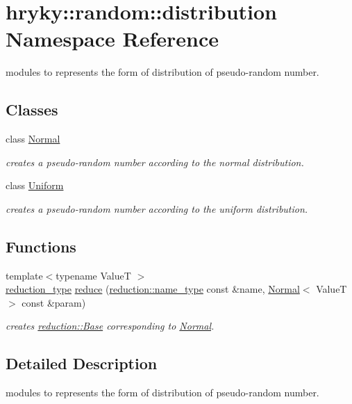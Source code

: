 \hypertarget{namespacehryky_1_1random_1_1distribution}{\section{hryky\-:\-:random\-:\-:distribution Namespace Reference}
\label{namespacehryky_1_1random_1_1distribution}
}


modules to represents the form of distribution of pseudo-\/random number.  


\subsection*{Classes}
\begin{DoxyCompactItemize}
\item 
class \hyperlink{classhryky_1_1random_1_1distribution_1_1_normal}{Normal}
\begin{DoxyCompactList}\small\item\em creates a pseudo-\/random number according to the normal distribution. \end{DoxyCompactList}\item 
class \hyperlink{classhryky_1_1random_1_1distribution_1_1_uniform}{Uniform}
\begin{DoxyCompactList}\small\item\em creates a pseudo-\/random number according to the uniform distribution. \end{DoxyCompactList}\end{DoxyCompactItemize}
\subsection*{Functions}
\begin{DoxyCompactItemize}
\item 
\hypertarget{namespacehryky_1_1random_1_1distribution_a036b49db88fa8504b2a893ce60f9ad03}{{\footnotesize template$<$typename Value\-T $>$ }\\\hyperlink{namespacehryky_a343a9a4c36a586be5c2693156200eadc}{reduction\-\_\-type} \hyperlink{namespacehryky_1_1random_1_1distribution_a036b49db88fa8504b2a893ce60f9ad03}{reduce} (\hyperlink{namespacehryky_1_1reduction_ac686c30a4c8d196bbd0f05629a6b921f}{reduction\-::name\-\_\-type} const \&name, \hyperlink{classhryky_1_1random_1_1distribution_1_1_normal}{Normal}$<$ Value\-T $>$ const \&param)}\label{namespacehryky_1_1random_1_1distribution_a036b49db88fa8504b2a893ce60f9ad03}

\begin{DoxyCompactList}\small\item\em creates \hyperlink{classhryky_1_1reduction_1_1_base}{reduction\-::\-Base} corresponding to \hyperlink{classhryky_1_1random_1_1distribution_1_1_normal}{Normal}. \end{DoxyCompactList}\end{DoxyCompactItemize}


\subsection{Detailed Description}
modules to represents the form of distribution of pseudo-\/random number. 